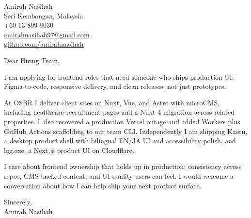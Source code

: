 \documentclass[11pt]{article}
\begin{document}
\begin{flushleft}
Amirah Nasihah\\
Seri Kembangan, Malaysia\\
+60 13-899 8030\\
\href{mailto:amirahnasihah97@gmail.com}{amirahnasihah97@gmail.com}\\
\href{https://github.com/amirahnasihah}{github.com/amirahnasihah}
\end{flushleft}

\vspace{12pt}
\noindent Dear Hiring Team,

I am applying for frontend roles that need someone who ships production UI:
Figma-to-code, responsive delivery, and clean releases, not just prototypes.

At OSBR I deliver client sites on Nuxt, Vue, and Astro with microCMS, including
healthcare-recruitment pages and a Nuxt 4 migration across related properties.
I also recovered a production Vercel outage and added Workers plus GitHub
Actions scaffolding to our team CLI. Independently I am shipping Kaeru, a
desktop product shell with bilingual EN/JA UI and accessibility polish, and
log.exe, a Next.js product UI on Cloudflare.

I care about frontend ownership that holds up in production: consistency across
repos, CMS-backed content, and UI quality users can feel. I would welcome a
conversation about how I can help ship your next product surface.

\vspace{12pt}
\noindent Sincerely,\\
Amirah Nasihah
\end{document}
